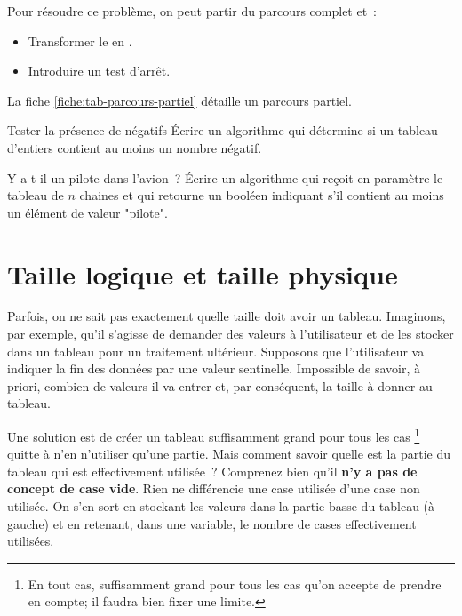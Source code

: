 			Pour résoudre ce problème,
			on peut partir du parcours complet et~:
			\begin{itemize}
			\item
				Transformer le  en .
			\item
				Introduire un test d’arrêt.
			\end{itemize}
			La fiche \vref{fiche:tab-parcours-partiel}
			détaille un parcours partiel.
				
			\begin{Exercice}{Tester la présence de négatifs}
				Écrire un algorithme qui
				détermine si un tableau d’entiers contient au moins un nombre négatif.
			\end{Exercice}

			\begin{Exercice}{Y a-t-il un pilote dans l’avion~?}
				Écrire un algorithme qui reçoit en paramètre le tableau
				 de $n$ chaines 
				et qui retourne un booléen 
				indiquant s’il contient au moins un élément de 
				valeur "pilote". 
			\end{Exercice}
		
	\section{Taille logique et taille physique} 

		Parfois, on ne sait pas exactement 
		quelle taille doit avoir un tableau.
		Imaginons, par exemple,
		qu’il s’agisse de demander des valeurs à l’utilisateur
		et de les stocker dans un tableau pour un traitement ultérieur.
		Supposons que l’utilisateur va indiquer la fin des données
		par une valeur sentinelle.
		Impossible de savoir, à priori, combien de valeurs il va entrer
		et, par conséquent, la taille à donner au tableau.
		
		Une solution est de créer un tableau suffisamment grand
		pour tous les cas%
		\footnote{%
			En tout cas, 
			suffisamment grand pour tous les cas qu’on accepte
			de prendre en compte; il faudra bien fixer une limite.
		} 
		quitte à n’en n’utiliser qu’une partie.
		Mais comment savoir quelle est la partie du tableau
		qui est effectivement utilisée~?
		Comprenez bien qu’il \textbf{n’y a pas de concept de case vide}.
		Rien ne différencie une case utilisée d’une case non utilisée.
		On s’en sort en stockant les valeurs 
		dans la partie basse du tableau (à gauche)
		et en retenant, dans une variable,
		le nombre de cases effectivement utilisées.
			
